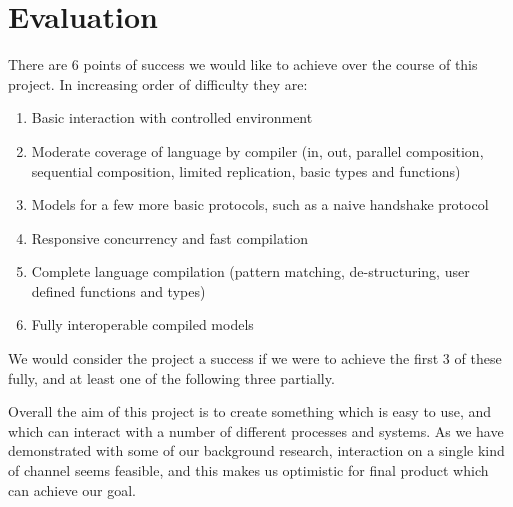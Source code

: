 \section{Evaluation}

There are 6 points of success we would like to achieve over the course of this project. In increasing order of difficulty they are:
\begin{enumerate}
    \item Basic interaction with controlled environment
    \item Moderate coverage of language by compiler (in, out, parallel composition, sequential composition, limited replication, basic types and functions) 
    \item Models for a few more basic protocols, such as a naive handshake protocol
    \item Responsive concurrency and fast compilation
    \item Complete language compilation (pattern matching, de-structuring, user defined functions and types)
    \item Fully interoperable compiled models
\end{enumerate}

We would consider the project a success if we were to achieve the first 3 of these fully, and at least one of the following three partially.

Overall the aim of this project is to create something which is easy to use, and which can interact with a number of different processes and systems. As we have demonstrated with some of our background research, interaction on a single kind of channel seems feasible, and this makes us optimistic for final product which can achieve our goal. 


